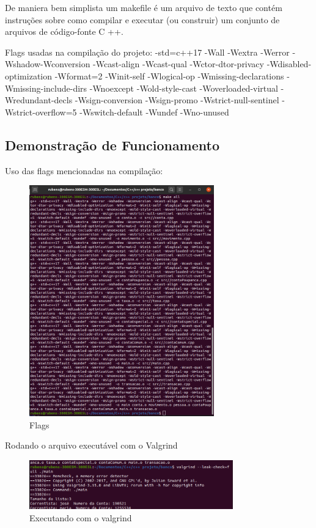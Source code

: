 \documentclass[conference]{IEEEtran}
\begin{document}
        De maniera bem simplista um makefile é um arquivo de texto que contém instruções sobre como compilar e executar (ou construir) um conjunto de arquivos de código-fonte C ++.

        Flags usadas na compilação do projeto: -std=c++17 -Wall -Wextra -Werror 
    -Wshadow-Wconversion -Wcast-align -Wcast-qual -Wctor-dtor-privacy -Wdisabled-optimization -Wformat=2 -Winit-self -Wlogical-op -Wmissing-declarations -Wmissing-include-dirs -Wnoexcept -Wold-style-cast -Woverloaded-virtual -Wredundant-decls -Wsign-conversion -Wsign-promo -Wstrict-null-sentinel -Wstrict-overflow=5 -Wswitch-default -Wundef -Wno-unused

    \subsection{Demonstração de Funcionamento}

    Uso das flags mencionadas na compilação:
    \begin{figure}[htbp]
        \centering
        \includegraphics[width=8cm]{../img/compilando.png}
        \caption{Flags}
        \label{fig_Flags}
    \end{figure}

    Rodando o arquivo executável com o Valgrind

    \begin{figure}[htbp]
        \centering
        \includegraphics[width=8.8cm]{../img/valgrind1.png}
        \caption{Executando com o valgrind}
        \label{fig_valgrind1}
    \end{figure}
\end{document}
